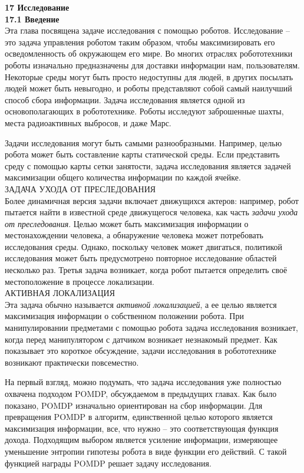 \documentclass[10pt,a4paper]{article}
\begin{document}
\textbf{17	Исследование}\\

\textbf{17.1	Введение}\\

Эта глава посвящена задаче исследования с помощью роботов. Исследование – это задача управления роботом таким образом, чтобы максимизировать его осведомленность об окружающем его мире. Во многих отраслях робототехники роботы изначально предназначены для доставки информации нам, пользователям. Некоторые среды могут быть просто недоступны для людей, в других посылать людей может быть невыгодно, и роботы представляют собой самый наилучший способ сбора информации. Задача исследования является одной из основополагающих в робототехнике. Роботы исследуют заброшенные шахты, места радиоактивных выбросов, и даже Марс.

Задачи исследования могут быть самыми разнообразными. Например, целью робота может быть составление карты статической среды. Если представить среду с помощью карты сетки занятости, задача исследования является задачей максимизации общего количества информации по каждой ячейке.\\

ЗАДАЧА УХОДА ОТ ПРЕСЛЕДОВАНИЯ\\
Более динамичная версия задачи включает движущихся актеров: например, робот пытается найти в известной среде движущегося человека, как часть \textit{задачи ухода от преследования}. Целью может быть максимизация информации о местонахождении человека, а обнаружение человека может потребовать исследования среды. Однако, поскольку человек может двигаться, политикой исследования может быть предусмотрено повторное исследование областей несколько раз. Третья задача возникает, когда робот пытается определить своё местоположение в процессе локализации.\\

АКТИВНАЯ ЛОКАЛИЗАЦИЯ\\
Эта задача
обычно называется \textit{активной локализацией}, а ее целью является максимизация информации о собственном положении робота. При манипулировании предметами с помощью робота задача исследования возникает, когда перед манипулятором с датчиком возникает незнакомый предмет. Как показывает это короткое обсуждение, задачи исследования в робототехнике возникают практически повсеместно.

На первый взгляд, можно подумать, что задача исследования уже  полностью охвачена подходом POMDP, обсуждаемом в предыдущих главах. Как было показано, POMDP изначально ориентирован на сбор информации. Для превращения POMDP в алгоритм, единственной целью которого является максимизация информации, все, что нужно – это соответствующая функция дохода. Подходящим выбором является усиление информации, измеряющее уменьшение энтропии гипотезы робота в виде функции его действий. С такой функцией награды POMDP решает задачу исследования.
\end{document}
